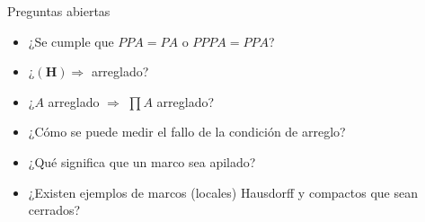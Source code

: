 \documentclass[compress,12pt]{beamer}
\begin{document}
\begin{frame}{Preguntas abiertas}
    \begin{itemize}
        \item ¿Se cumple que $PPA=PA$ o $PPPA=PPA$?
        \item ¿$\mathbf{(H)}\Rightarrow$ arreglado?
        \item ¿$A$ arreglado $\Rightarrow$ $\prod A$ arreglado?
        \item ¿Cómo se puede medir el fallo de la condición de arreglo?
        \item ¿Qué significa que un marco sea apilado?
        \item ¿Existen ejemplos de marcos (locales) Hausdorff y compactos que sean cerrados?
        \end{itemize}
\end{frame}
\end{document}
